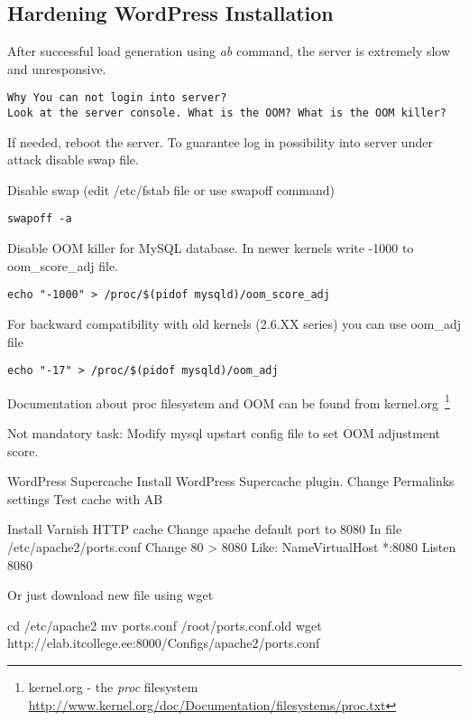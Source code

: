 \subsection{Hardening WordPress Installation}
After successful load generation using \emph{ab} command, the server is extremely slow and unresponsive.

\begin{Verbatim}[samepage=true,frame=single,
label=Discussion,framesep=2mm,rulecolor=\color{blue},commandchars=\\\{\}]
Why You can not login into server?
Look at the server console. What is the OOM? What is the OOM killer?
\end{Verbatim}


If needed, reboot the server. To  guarantee log in possibility into server under attack disable swap file.

Disable swap (edit /etc/fstab file or use swapoff command)


\begin{verbatim}
swapoff -a
\end{verbatim}

Disable OOM killer for MySQL database. In newer kernels write -1000 to oom\_score\_adj file.

\begin{verbatim}
echo "-1000" > /proc/$(pidof mysqld)/oom_score_adj
\end{verbatim}
For backward compatibility with old kernels (2.6.XX series) you can use oom\_adj file
\begin{verbatim}
echo "-17" > /proc/$(pidof mysqld)/oom_adj
\end{verbatim}
Documentation about proc filesystem and OOM can be found from kernel.org~\footnote{kernel.org - the \emph{proc} filesystem \url{http://www.kernel.org/doc/Documentation/filesystems/proc.txt}}

Not mandatory task: Modify mysql upstart config file to set OOM adjustment score.

WordPress Supercache
Install WordPress Supercache plugin.
Change Permalinks settings
Test cache with AB

Install Varnish HTTP cache
Change apache default port to 8080
In file /etc/apache2/ports.conf
Change 80 > 8080
Like:
NameVirtualHost *:8080
Listen 8080

Or just download new file using wget 

cd /etc/apache2
mv ports.conf /root/ports.conf.old
wget http://elab.itcollege.ee:8000/Configs/apache2/ports.conf

